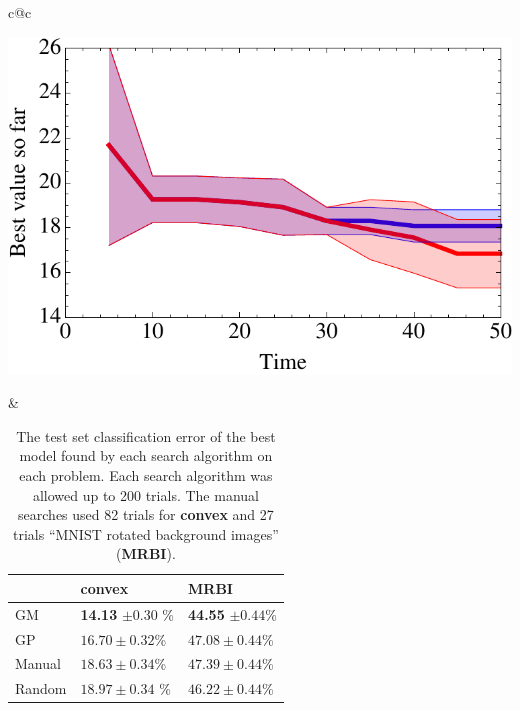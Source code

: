 \documentclass{article}
\newcommand{\vs}[1]{\vspace*{-#1mm}}
\begin{document}
\begin{table}[t]
\vs{2}
\begin{center}
\begin{tabular}{c@{}c}
\begin{minipage}{0.43\linewidth}
\begin{center}
\includegraphics[scale=.39]{../nips2011paper/figures/bostonHousing.pdf}
\vs{3}
\end{center}
\end{minipage}
&
\hspace*{6mm}\begin{minipage}{0.45\linewidth}
    \begin{center}
    \begin{tabular}{lll}
                & {\bf convex} & {\bf MRBI} \\
        \hline
        GM & {\bf 14.13} $ \pm 0.30$ \% & {\bf 44.55} $ \pm 0.44$\%   \\
        GP & $ 16.70 \pm 0.32$\% &  $ 47.08\pm 0.44 $\% \\
        Manual & $18.63 \pm 0.34$\%  &  $47.39 \pm 0.44$\%  \\
        Random &  $ 18.97\pm 0.34$ \%  & $46.22 \pm 0.44$\% \\
        \hline
    \end{tabular}
    \end{center}
    \caption{The test set classification error of the best model
    found by each search algorithm on each problem.
    Each search algorithm was allowed up to 200 trials.
    The manual searches used 82 trials for {\bf convex}
    and 27 trials ``MNIST rotated background images'' ({\bf MRBI}).
    \label{tbl:testerr}
    }
\end{minipage}
\end{tabular}
\end{center}
\vs{6}
\end{table}
\end{document}
